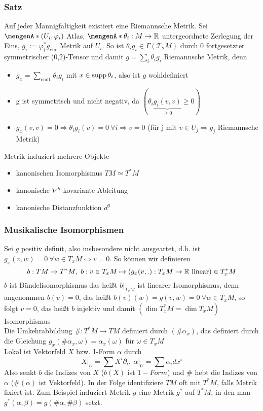 \subsubsection{Satz}
\label{ssub:25}
Auf jeder Mannigfaltigkeit existiert eine Riemannsche Metrik.
Sei $\set{(U_i,\varphi_i)}$ Atlas, $\set{\theta_i:M\to\mathds{R}}$ untergeordnete Zerlegung der Eins, $g_i:=\varphi_i^*g_{euc}$ Metrik auf $U_i$. So ist $\theta_i g_i\in\Gamma(\mathcal{T}_2 M)$ durch 0 fortgesetzter symmetrischer (0,2)-Tensor und damit $g=\sum_i \theta_i g_i$ Riemannsche Metrik, denn 
\begin{itemize}
\item $g_x=\sum_{\text{endl.}} \theta_i g_i$ mit $x\in \operatorname{supp} \theta_i$, also ist $g$ wohldefiniert
\item g ist symmetrisch und nicht negativ, da $(\theta_i\underset{\geq 0}{\underbrace{g_i(v,v)}}\geq 0)$
\item $g_x(v,v)=0\Rightarrow \theta_ig_i(v)=0~\forall i\Rightarrow v=0$ (für j mit $v\in U_j\Rightarrow g_j$ Riemannsche Metrik)
\end{itemize}

Metrik induziert mehrere Objekte 
\begin{itemize}
\item kanonischen Isomorphismus $TM\simeq T^*M$
\item kanonische $\nabla^g$ kovariante Ableitung
\item kanonische Distanzfunktion $d^g$
\end{itemize}

\subsubsection{Musikalische Isomorphismen}
\label{ssub:26}
Sei $g$ positiv definit, also insbesondere nicht ausgeartet, d.h. ist $g_x(v,w)=0~\forall w\in T_xM\iff v=0$. So können wir definieren
\[
b:TM\to T^* M,\ b: v\in T_x M\mapsto \enbrace*{g_x (v,.):T_x M\to\mathds{R}\ \text{linear}}\in T_x^* M
\]
$b$ ist Bündelisomorphismus das heißt $b\vert_{T_x M}$ ist linearer Isomorphismus, denn angenommen $b(v)=0$, das heißt $b(v)(w) = g(v,w) = 0\ \forall w\in T_x M$, so folgt $v=0$, das heißt $b$ injektiv und damit $(\dim T_x^* M = \dim T_x M)$ Isomorphismus\\
Die Umkehrabbildung $\#:T^* M\to TM$ definiert durch $(\#\alpha_x)$, das definiert durch die Gleichung $g_x(\#\alpha_x,\omega)=\alpha_x(\omega)$ für $\omega\in T_x M$\\
Lokal ist Vektorfeld $X$ bzw. 1-Form $\alpha$ durch 
\[X\vert_U=\sum X^i\partial_i,\ \alpha\vert_U=\sum\alpha_idx^i\]
Also senkt $b$ die Indizes von $X$ ($b(X)$ ist $1-Form$) und $\#$ hebt die Indizes von $\alpha$ ($\#(\alpha)$ ist Vektorfeld).
In der Folge identifiziere $TM$ oft mit $T^*M$, falls Metrik fixiert ist. Zum Beispiel induziert Metrik $g$ eine Metrik $g^*$ auf $T^* M$, in den man $g^*(\alpha,\beta)=g(\#\alpha,\#\beta)$ setzt. 

